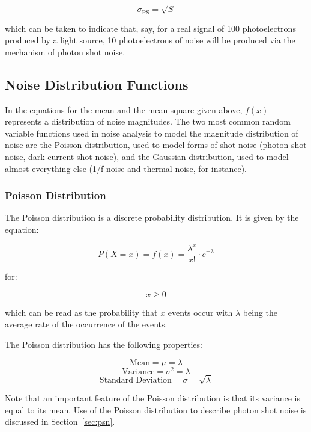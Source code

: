 \documentclass[10pt]{article}
\begin{document}
$$ \sigma_{\text{PS}} = \sqrt{S} $$

\vspace{2mm}

\noindent which can be taken to indicate that, say, for a real signal of 100 photoelectrons produced by a light source, 10 photoelectrons of noise will be produced via the mechanism of photon shot noise.

\subsection{Noise Distribution Functions}

In the equations for the mean and the mean square given above, $f(x)$ represents a distribution of noise magnitudes. The two most common random variable functions used in noise analysis to model the magnitude distribution of noise are the Poisson distribution, used to model forms of shot noise (photon shot noise, dark current shot noise), and the Gaussian distribution, used to model almost everything else (1/f noise and thermal noise, for instance). 

\subsubsection{Poisson Distribution}

The Poisson distribution is a discrete probability distribution. It is given by the equation:

$$P(X=x) = f(x)=\frac{\lambda^x}{x!} \cdot e^{-\lambda}$$

\noindent for:

\vspace{-4mm}

$$x \ge 0$$

\noindent which can be read as the probability that $x$ events occur with $\lambda$ being the average rate of the occurrence of the events. 

The Poisson distribution has the following properties:

\vspace{-1mm}

$$ \text{Mean} = \mu = \lambda$$
$$ \text{Variance} = \sigma^2 = \lambda$$
$$ \text{Standard Deviation} = \sigma = \sqrt{\lambda}$$

\vspace{2mm}

\noindent Note that an important feature of the Poisson distribution is that its variance is equal to its mean. Use of the Poisson distribution to describe photon shot noise is discussed in Section~\ref{sec:psn}.
\end{document}
